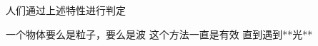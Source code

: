 \begin{frame} 
    人们通过上述特性进行判定\\
    \begin{itemize}
        \Item  一个物体要么是粒子，要么是波
        \Item  这个方法一直是有效
        \Item  直到遇到**光** 
    \end{itemize}   
    \begin{figure}
        \centering
    \end{figure} 
\end{frame}

